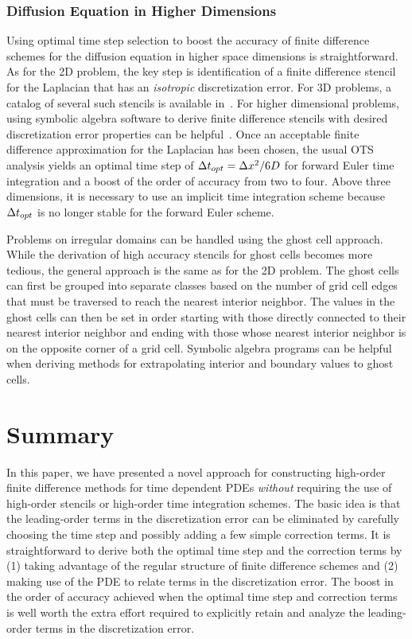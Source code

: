 \documentclass[oneeqnum,onefignum,onetabnum,onethmnum]{siamltex}
\begin{document}
\subsubsection{Diffusion Equation in Higher Dimensions}
Using optimal time step selection to boost the accuracy of finite difference
schemes for the diffusion equation in higher space dimensions is 
straightforward.  As for the 2D problem, the key step is identification of a 
finite difference stencil for the Laplacian that has an \emph{isotropic} 
discretization error.  For 3D problems, a catalog of several such stencils is 
available in~\cite{patra_2005}.  For higher dimensional problems, using 
symbolic algebra software to derive finite difference stencils with desired 
discretization error properties can be helpful~\cite{patra_2005, gupta_1998}.  
Once an acceptable finite difference approximation for the Laplacian has been 
chosen, the usual OTS analysis yields an optimal time step of 
$\Delta t_{opt} = \Delta x^2/6D$ for forward Euler time integration and a boost of the 
order of accuracy from two to four.  Above three dimensions, it is necessary 
to use an implicit time integration scheme because $\Delta t_{opt}$ is no longer 
stable for the forward Euler scheme.

Problems on irregular domains can be handled using the ghost cell approach. 
While the derivation of high accuracy stencils for ghost cells becomes more
tedious, the general approach is the same as for the 2D problem.  The ghost 
cells can first be grouped into separate classes based on the number of 
grid cell edges that must be traversed to reach the nearest interior neighbor.
The values in the ghost cells can then be set in order starting with those 
directly connected to their nearest interior neighbor and ending with those 
whose nearest interior neighbor is on the opposite corner of a grid cell.
Symbolic algebra programs can be helpful when deriving methods for 
extrapolating interior and boundary values to ghost cells.


\section{\label{sec:summary} Summary} 
In this paper, we have presented a novel approach for constructing high-order
finite difference methods for time dependent PDEs \emph{without} requiring
the use of high-order stencils or high-order time integration schemes.  
The basic idea is that the leading-order terms in the discretization error
can be eliminated by carefully choosing the time step and possibly adding
a few simple correction terms.  It is straightforward to derive both the 
optimal time step and the correction terms by (1) taking advantage of the 
regular structure of finite difference schemes and (2) making use of the
PDE to relate terms in the discretization error.  The boost in the order
of accuracy achieved when the optimal time step and correction terms is well
worth the extra effort required to explicitly retain and analyze the 
leading-order terms in the discretization error.   
\end{document}
